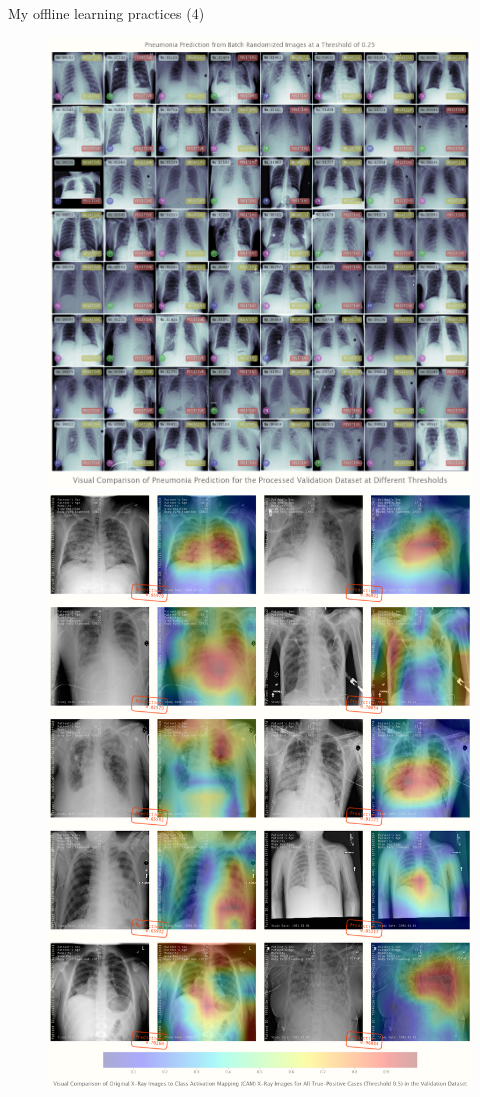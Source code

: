 \documentclass{beamer}
\begin{document}
\begin{frame}[fragile]{My offline learning practices (4)}
\begin{figure}[!htb]
			\centering\includegraphics[width=\linewidth]{images/deep_learning_5_1_2.png}
			\endminipage\hfill
			\centering\includegraphics[width=\linewidth]{images/deep_learning_5_2.png}

\end{figure}
\end{frame}
\end{document}
